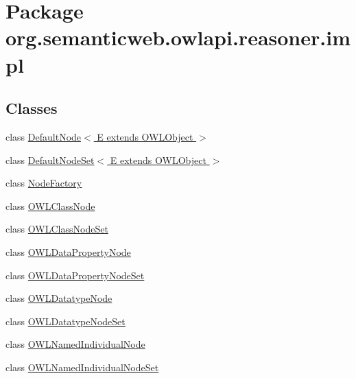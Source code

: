\hypertarget{namespaceorg_1_1semanticweb_1_1owlapi_1_1reasoner_1_1impl}{\section{Package org.\-semanticweb.\-owlapi.\-reasoner.\-impl}
\label{namespaceorg_1_1semanticweb_1_1owlapi_1_1reasoner_1_1impl}
}
\subsection*{Classes}
\begin{DoxyCompactItemize}
\item 
class \hyperlink{classorg_1_1semanticweb_1_1owlapi_1_1reasoner_1_1impl_1_1_default_node_3_01_e_01extends_01_o_w_l_object_01_4}{Default\-Node$<$ E extends O\-W\-L\-Object $>$}
\item 
class \hyperlink{classorg_1_1semanticweb_1_1owlapi_1_1reasoner_1_1impl_1_1_default_node_set_3_01_e_01extends_01_o_w_l_object_01_4}{Default\-Node\-Set$<$ E extends O\-W\-L\-Object $>$}
\item 
class \hyperlink{classorg_1_1semanticweb_1_1owlapi_1_1reasoner_1_1impl_1_1_node_factory}{Node\-Factory}
\item 
class \hyperlink{classorg_1_1semanticweb_1_1owlapi_1_1reasoner_1_1impl_1_1_o_w_l_class_node}{O\-W\-L\-Class\-Node}
\item 
class \hyperlink{classorg_1_1semanticweb_1_1owlapi_1_1reasoner_1_1impl_1_1_o_w_l_class_node_set}{O\-W\-L\-Class\-Node\-Set}
\item 
class \hyperlink{classorg_1_1semanticweb_1_1owlapi_1_1reasoner_1_1impl_1_1_o_w_l_data_property_node}{O\-W\-L\-Data\-Property\-Node}
\item 
class \hyperlink{classorg_1_1semanticweb_1_1owlapi_1_1reasoner_1_1impl_1_1_o_w_l_data_property_node_set}{O\-W\-L\-Data\-Property\-Node\-Set}
\item 
class \hyperlink{classorg_1_1semanticweb_1_1owlapi_1_1reasoner_1_1impl_1_1_o_w_l_datatype_node}{O\-W\-L\-Datatype\-Node}
\item 
class \hyperlink{classorg_1_1semanticweb_1_1owlapi_1_1reasoner_1_1impl_1_1_o_w_l_datatype_node_set}{O\-W\-L\-Datatype\-Node\-Set}
\item 
class \hyperlink{classorg_1_1semanticweb_1_1owlapi_1_1reasoner_1_1impl_1_1_o_w_l_named_individual_node}{O\-W\-L\-Named\-Individual\-Node}
\item 
class \hyperlink{classorg_1_1semanticweb_1_1owlapi_1_1reasoner_1_1impl_1_1_o_w_l_named_individual_node_set}{O\-W\-L\-Named\-Individual\-Node\-Set}

\end{DoxyCompactItemize}

